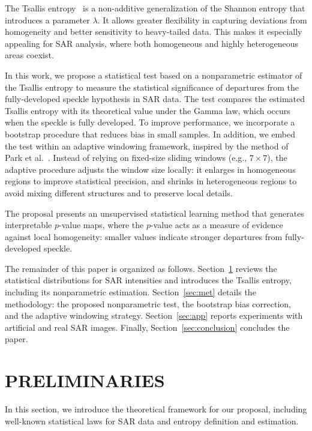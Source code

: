 \documentclass[
  lettersize  journal,
]{IEEEtran}%
\begin{document}
The Tsallis entropy~ is a
non-additive generalization of the Shannon entropy that introduces a
parameter \(\lambda\). It allows greater flexibility in capturing
deviations from homogeneity and better sensitivity to heavy-tailed data.
This makes it especially appealing for SAR analysis, where both
homogeneous and highly heterogeneous areas coexist.

In this work, we propose a statistical test based on a nonparametric
estimator of the Tsallis entropy to measure the statistical significance
of departures from the fully-developed speckle hypothesis in SAR data.
The test compares the estimated Tsallis entropy with its theoretical
value under the Gamma law, which occurs when the speckle is fully
developed. To improve performance, we incorporate a bootstrap procedure
that reduces bias in small samples. In addition, we embed the test
within an adaptive windowing framework, inspired by the method of Park
et al.~. Instead of relying on
fixed-size sliding windows (e.g., \(7 \times 7\)), the adaptive
procedure adjusts the window size locally: it enlarges in homogeneous
regions to improve statistical precision, and shrinks in heterogeneous
regions to avoid mixing different structures and to preserve local
details.

The proposal presents an unsupervised statistical learning method that
generates interpretable \(p\)-value maps, where the \(p\)-value acts as
a measure of evidence against local homogeneity: smaller values indicate
stronger departures from fully-developed speckle.

The remainder of this paper is organized as follows.
Section~\ref{sec:pre} reviews the statistical distributions for SAR
intensities and introduces the Tsallis entropy, including its
nonparametric estimation. Section~\ref{sec:met} details the methodology:
the proposed nonparametric test, the bootstrap bias correction, and the
adaptive windowing strategy. Section~\ref{sec:app} reports experiments
with artificial and real SAR images. Finally,
Section~\ref{sec:conclusion} concludes the paper.

\section{PRELIMINARIES}\label{sec:pre}

In this section, we introduce the theoretical framework for our
proposal, including well-known statistical laws for SAR data and entropy
definition and estimation.
\end{document}
